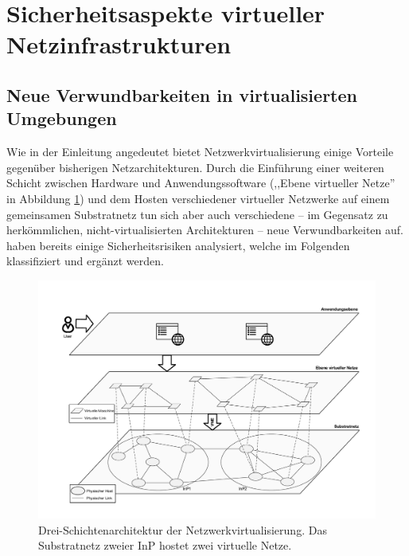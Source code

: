 \documentclass{lni}
\begin{document}
\section{Sicherheitsaspekte virtueller Netzinfrastrukturen}
\label{sec:gefahren}

%


\subsection{Neue Verwundbarkeiten in virtualisierten Umgebungen}
\label{subsec:gefahren_virt}
Wie in der Einleitung angedeutet bietet Netzwerkvirtualisierung einige Vorteile gegenüber bisherigen Netzarchitekturen. Durch die Einführung einer weiteren Schicht zwischen Hardware und Anwendungssoftware (,,Ebene virtueller Netze'' in Abbildung \ref{fig:gefahren_dreiEbenenDerVirtualisierung}) und dem Hosten verschiedener virtueller Netzwerke auf einem gemeinsamen Substratnetz tun sich aber auch verschiedene -- im Gegensatz zu herkömmlichen, nicht-virtualisierten Architekturen -- neue Verwundbarkeiten auf. \cite{gong2016virtual, natarajansecurity, wu2010network, garfinkel2005virtual, dahbur2011survey} haben bereits einige Sicherheitsrisiken analysiert, welche im Folgenden klassifiziert und ergänzt werden.

\begin{figure}[htb]
	\begin{center}
		\includegraphics[width=\textwidth]{gefahren_dreiEbenenDerVirtualisierung.pdf}
		\caption{\label{fig:gefahren_dreiEbenenDerVirtualisierung} Drei-Schichtenarchitektur der Netzwerkvirtualisierung. \newline Das Substratnetz zweier InP hostet zwei virtuelle Netze.}
	\end{center}
\end{figure}
\end{document}
